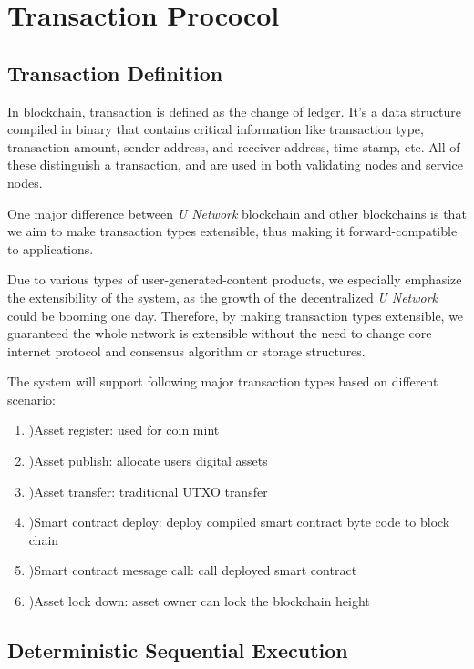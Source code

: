 \section{Transaction Prococol}

\subsection{Transaction Definition}
	In blockchain, transaction is defined as the change of ledger. It's a data structure compiled in binary that contains critical information like transaction type, transaction amount, sender address, and receiver address, time stamp, etc. All of these distinguish a transaction, and are used in both validating nodes and service nodes.  

    One major difference between \emph{U Network} blockchain and other blockchains is that we aim to make transaction types extensible, thus making it forward-compatible to applications. 
	
	Due to various types of user-generated-content products, we especially emphasize the extensibility of the system, as the growth of the decentralized \emph{U Network} could be booming one day. Therefore, by making transaction types extensible, we guaranteed the whole network is extensible without the need to change core internet protocol and consensus algorithm or storage structures.
	
	The system will support following major transaction types based on different scenario: 
	
	\begin{enumerate}
	\item )Asset register: used for coin mint
	\item )Asset publish: allocate users digital assets
    \item )Asset transfer: traditional UTXO transfer
    \item )Smart contract deploy: deploy compiled smart contract byte code to block chain
    \item )Smart contract message call: call deployed smart contract
    \item )Asset lock down: asset owner can lock the blockchain height
	\end{enumerate}

\subsection{Deterministic Sequential Execution}

